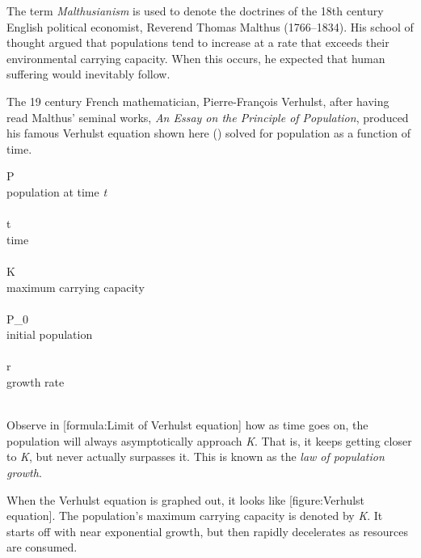 The term {\it Malthusianism} is used to denote the doctrines of the 18th century English political economist, Reverend Thomas Malthus (1766--1834). His school of thought argued that populations tend to increase at a rate that exceeds their environmental carrying capacity. When this occurs, he expected that human suffering would inevitably follow.\footnotecite[malthus1798]

The 19 century French mathematician, Pierre-François Verhulst, after having read Malthus' seminal works, {\it An Essay on the Principle of Population}, produced his famous Verhulst equation shown here () solved for population as a function of time.
\crlf

\startformula
{}
\stopformula
\startlegend
\leg P \\ population at time {\it t} \\ \\
\leg t \\ time \\ \\
\leg K \\ maximum carrying capacity \\ \\
\leg P_0 \\ initial population \\ \\
\leg r \\ growth rate \\ \\
\stoplegend
\crlf

Observe in [formula:Limit of Verhulst equation] how as time goes on, the population will always asymptotically approach {\it K}. That is, it keeps getting closer to {\it K}, but never actually surpasses it. This is known as the {\it law of population growth}. 
\crlf

\startformula
{}
\stopformula
\crlf

When the Verhulst equation is graphed out, it looks like [figure:Verhulst equation]. The population's maximum carrying capacity is denoted by {\it K}. It starts off with near exponential growth, but then rapidly decelerates as resources are consumed.

    {}

